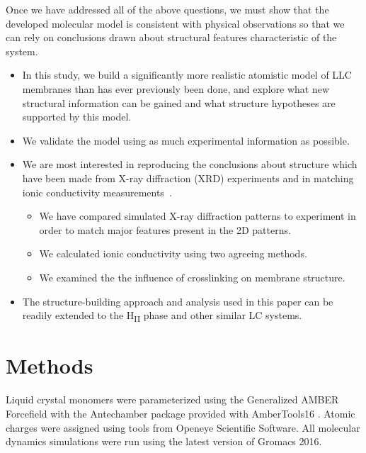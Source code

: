 \documentclass{article}
\begin{document}
  Once we have addressed all of the above questions, we must show that the 
  developed molecular model is consistent with physical observations so that we
  can rely on conclusions drawn about structural features characteristic of 
  the system.
  \begin{itemize}
    \item In this study, we build a significantly more realistic atomistic model of LLC membranes 
    than has ever previously been done, and explore what new structural information can be gained
    and what structure hypotheses are supported by this model.
    \item We validate the model using as much experimental information as possible.
    \item We are most interested in reproducing the conclusions about structure
    which have been made from X-ray diffraction (XRD) experiments and in matching ionic
    conductivity measurements~\cite{feng_thin_2016}.
    \begin{itemize}
	    \item We have compared simulated X-ray diffraction patterns to experiment in 
	    order to match major features present in the 2D patterns.
	    \item We calculated ionic conductivity using two agreeing methods.
	    \item We examined the the influence of crosslinking on membrane structure.
    \end{itemize}
    \item The structure-building approach and analysis used in this paper can be readily extended
    to the H\textsubscript{II} phase and other similar LC systems.
  \end{itemize}
  
  \section*{Methods}
  
  Liquid crystal monomers were parameterized using the Generalized AMBER Forcefield
  \cite{wang_development_2004} with the Antechamber package \cite{wang_automatic_2006}
  provided with AmberTools16 \cite{case_ambertools16_2016}. Atomic charges were
  assigned using tools from Openeye Scientific Software. All molecular dynamics 
  simulations were run using the latest version of Gromacs 2016. 
  \cite{bekker_gromacs:_1993,berendsen_gromacs:_1995,van_der_spoel_gromacs:_2005,hess_gromacs_2008}
  
\end{document}
